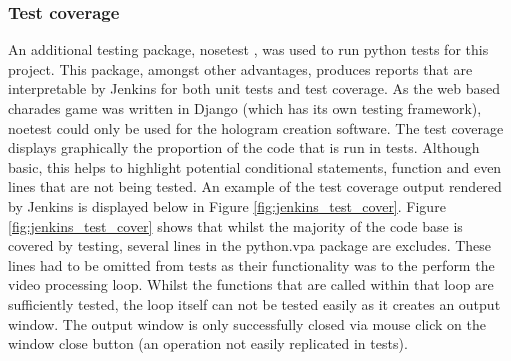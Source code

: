 \subsubsection{Test coverage} 
An additional testing package, nosetest \cite{nosetest}, was used to run python tests for this project. This package, amongst other advantages, produces reports that are interpretable by Jenkins for both unit tests and test coverage. As the web based charades game was written in Django (which has its own testing framework), noetest could only be used for the hologram creation software. The test coverage displays graphically the proportion of the code that is run in tests. Although basic, this helps to highlight potential conditional statements, function and even lines that are not being tested. An example of the test coverage output rendered by Jenkins is displayed below in Figure \ref{fig:jenkins_test_cover}. Figure \ref{fig:jenkins_test_cover} shows that whilst the majority of the code base is covered by testing, several lines in the python.vpa package are excludes. These lines had to be omitted from tests as their functionality was to the perform the video processing loop. Whilst the functions that are called within that loop are sufficiently tested, the loop itself can not be tested easily as it creates an output window. The output window is only successfully closed via mouse click on the window close button (an operation not easily replicated in tests).
\begin{figure}[h!]
\end{figure}
 

